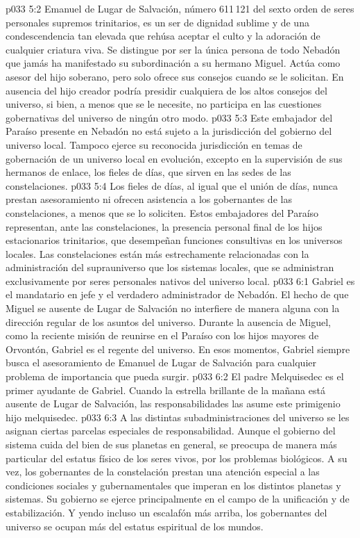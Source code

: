 \vs p033 5:2 Emanuel de Lugar de Salvación, número 611\,121 del sexto orden de seres personales supremos trinitarios, es un ser de dignidad sublime y de una condescendencia tan elevada que rehúsa aceptar el culto y la adoración de cualquier criatura viva. Se distingue por ser la única persona de todo Nebadón que jamás ha manifestado su subordinación a su hermano Miguel. Actúa como asesor del hijo soberano, pero solo ofrece sus consejos cuando se le solicitan. En ausencia del hijo creador podría presidir cualquiera de los altos consejos del universo, si bien, a menos que se le necesite, no participa en las cuestiones gobernativas del universo de ningún otro modo.
\vs p033 5:3 Este embajador del Paraíso presente en Nebadón no está sujeto a la jurisdicción del gobierno del universo local. Tampoco ejerce su reconocida jurisdicción en temas de gobernación de un universo local en evolución, excepto en la supervisión de sus hermanos de enlace, los fieles de días, que sirven en las sedes de las constelaciones.
\vs p033 5:4 Los fieles de días, al igual que el unión de días, nunca prestan asesoramiento ni ofrecen asistencia a los gobernantes de las constelaciones, a menos que se lo soliciten. Estos embajadores del Paraíso representan, ante las constelaciones, la presencia personal final de los hijos estacionarios trinitarios, que desempeñan funciones consultivas en los universos locales. Las constelaciones están más estrechamente relacionadas con la administración del suprauniverso que los sistemas locales, que se administran exclusivamente por seres personales nativos del universo local.
\vs p033 6:1 Gabriel es el mandatario en jefe y el verdadero administrador de Nebadón. El hecho de que Miguel se ausente de Lugar de Salvación no interfiere de manera alguna con la dirección regular de los asuntos del universo. Durante la ausencia de Miguel, como la reciente misión de reunirse en el Paraíso con los hijos mayores de Orvontón, Gabriel es el regente del universo. En esos momentos, Gabriel siempre busca el asesoramiento de Emanuel de Lugar de Salvación para cualquier problema de importancia que pueda surgir.
\vs p033 6:2 El padre Melquisedec es el primer ayudante de Gabriel. Cuando la estrella brillante de la mañana está ausente de Lugar de Salvación, las responsabilidades las asume este primigenio hijo melquisedec.
\vs p033 6:3 \pc A las distintas subadministraciones del universo se les asignan ciertas parcelas especiales de responsabilidad. Aunque el gobierno del sistema cuida del bien de sus planetas en general, se preocupa de manera más particular del estatus físico de los seres vivos, por los problemas biológicos. A su vez, los gobernantes de la constelación prestan una atención especial a las condiciones sociales y gubernamentales que imperan en los distintos planetas y sistemas. Su gobierno se ejerce principalmente en el campo de la unificación y de estabilización. Y yendo incluso un escalafón más arriba, los gobernantes del universo se ocupan más del estatus espiritual de los mundos.
